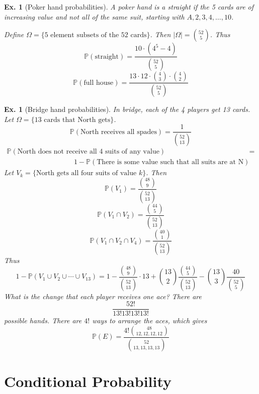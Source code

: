 \documentclass[12pt, a4paper]{book}
\renewcommand{\Pr}{\mathbb{P}}
\newtheorem{example}[theorem]{Ex.}
\theoremstyle{nonumberplain}
\begin{document}
\begin{example}[Poker hand probabilities]
    A poker hand is a straight if the 5 cards are of increasing value and not all of the same suit, starting with $A,2,3,4,\ldots,10$.

    Define $\Omega=\{\text{5 element subsets of the 52 cards}\}$.
    Then $|\Omega|=\binom{52}{5}$.
    Thus
    \[\Pr(\text{straight})=\frac{10\cdot (4^5-4)}{\binom{52}{5}}\]
    \[\Pr(\text{full house})=\frac{13\cdot 12\cdot\binom{4}{3}\cdot\binom{4}{2}}{\binom{52}{5}}\]
\end{example}
\begin{example}[Bridge hand probabilities]
    In bridge, each of the 4 players get 13 cards.
    Let $\Omega=\{\text{13 cards that North gets}\}$.
    \[\Pr(\text{North receives all spades})=\frac{1}{\binom{52}{13}}\]
    \begin{align*}
        \Pr(\text{North does not receive all 4 suits of any value})&=\\
        \hspace{4cm}1-\Pr(\text{There is some value such that all suits are at N})
    \end{align*}
    Let $V_k=\{\text{North gets all four suits of value $k$}\}$.
    Then
    \[\Pr(V_1)=\frac{\binom{48}{9}}{\binom{52}{13}}\]
    \[\Pr(V_1\cap V_2)=\frac{\binom{44}{5}}{\binom{52}{13}}\]
    \[\Pr(V_1\cap V_2\cap V_4)=\frac{\binom{40}{1}}{\binom{52}{13}}\]
    Thus
    \[1-\Pr(V_1\cup V_2\cup\cdots\cup V_{13})=1-\frac{\binom{48}{9}}{\binom{52}{13}}\cdot 13+\binom{13}{2}\frac{\binom{44}{5}}{\binom{52}{13}}-\binom{13}{3}\frac{40}{\binom{52}{5}}\]
    What is the change that each player receives one ace?
    There are
    \[\frac{52!}{13!13!13!13!}\]
    possible hands.
    There are $4!$ ways to arrange the aces, which gives
    \[\Pr(E)=\frac{4!\binom{48}{12,12,12,12}}{\binom{52}{13,13,13,13}}\]
\end{example}
\section{Conditional Probability}
\end{document}
